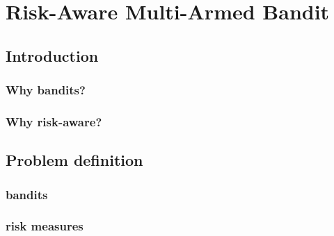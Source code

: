 \section{Risk-Aware Multi-Armed Bandit}
\frame{\sectionpage}

\subsection{Introduction}
\subsubsection{Why bandits?}
\subsubsection{Why risk-aware?}

\subsection{Problem definition}
\subsubsection{bandits}
\subsubsection{risk measures}
